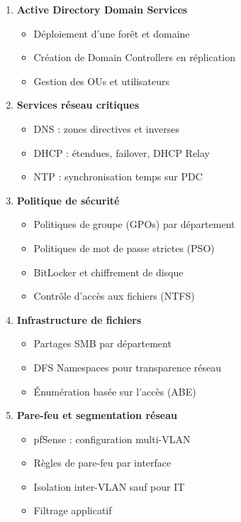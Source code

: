 \begin{enumerate}
    \item \textbf{Active Directory Domain Services}
    \begin{itemize}
        \item Déploiement d'une forêt et domaine
        \item Création de Domain Controllers en réplication
        \item Gestion des OUs et utilisateurs
    \end{itemize}

    \item \textbf{Services réseau critiques}
    \begin{itemize}
        \item DNS : zones directives et inverses
        \item DHCP : étendues, failover, DHCP Relay
        \item NTP : synchronisation temps sur PDC
    \end{itemize}

    \item \textbf{Politique de sécurité}
    \begin{itemize}
        \item Politiques de groupe (GPOs) par département
        \item Politiques de mot de passe strictes (PSO)
        \item BitLocker et chiffrement de disque
        \item Contrôle d'accès aux fichiers (NTFS)
    \end{itemize}

    \item \textbf{Infrastructure de fichiers}
    \begin{itemize}
        \item Partages SMB par département
        \item DFS Namespaces pour transparence réseau
        \item Énumération basée sur l'accès (ABE)
    \end{itemize}

    \item \textbf{Pare-feu et segmentation réseau}
    \begin{itemize}
        \item pfSense : configuration multi-VLAN
        \item Règles de pare-feu par interface
        \item Isolation inter-VLAN sauf pour IT
        \item Filtrage applicatif
    \end{itemize}


\end{enumerate}
